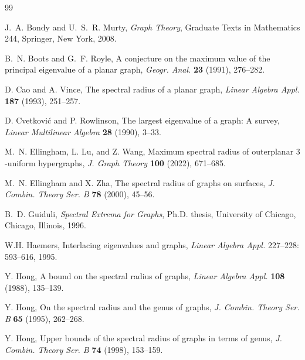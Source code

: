 \documentclass[11pt]{article}
\theoremstyle{plain}
\theoremstyle{definition}
\numberwithin{equation}{section}
\begin{document}
\begin{thebibliography}{99}

J.~A. Bondy and U.~S.~R. Murty,
\emph{Graph Theory},
Graduate Texts in Mathematics 244,
Springer, New York, 2008.

B.~N. Boots and G.~F. Royle,
\newblock A conjecture on the maximum value of the principal eigenvalue
of a planar graph,
\newblock \emph{Geogr. Anal.} \textbf{23} (1991), 276--282.

D. Cao and A. Vince,
\newblock The spectral radius of a planar graph,
\newblock \emph{Linear Algebra Appl.} \textbf{187} (1993), 251--257.

D. Cvetkovi\'c and P. Rowlinson,
\newblock The largest eigenvalue of a graph: A survey,
\newblock \emph{Linear Multilinear Algebra} \textbf{28} (1990), 3--33.

M.~N. Ellingham, L. Lu, and Z. Wang,
\newblock Maximum spectral radius of outerplanar $3$-uniform hypergraphs,
\newblock \emph{J. Graph Theory} \textbf{100} (2022), 671--685.

M.~N. Ellingham and X. Zha,
\newblock The spectral radius of graphs on surfaces,
\newblock \emph{J. Combin. Theory Ser. B} \textbf{78} (2000), 45--56.

B.~D. Guiduli,
\newblock \emph{Spectral Extrema for Graphs},
\newblock Ph.D. thesis, University of Chicago, Chicago, Illinois, 1996.


W.H. Haemers, Interlacing eigenvalues and graphs,
\textit{Linear Algebra Appl.} 227--228: 593--616, 1995.


Y. Hong,
\newblock A bound on the spectral radius of graphs,
\newblock \emph{Linear Algebra Appl.} \textbf{108} (1988), 135--139.

Y. Hong,
\newblock On the spectral radius and the genus of graphs,
\newblock \emph{J. Combin. Theory Ser. B} \textbf{65} (1995), 262--268.

Y. Hong,
\newblock Upper bounds of the spectral radius of graphs in terms of genus,
\newblock \emph{J. Combin. Theory Ser. B} \textbf{74} (1998), 153--159.


\end{thebibliography}
\end{document}

